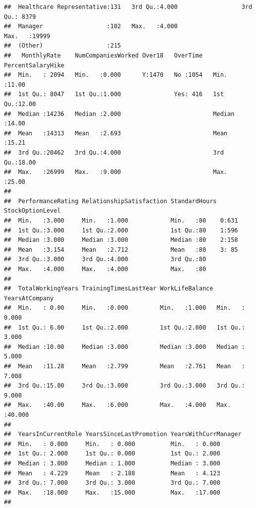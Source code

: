\documentclass[
]{article}
\begin{document}
\begin{verbatim}
##  Healthcare Representative:131   3rd Qu.:4.000                  3rd Qu.: 8379  
##  Manager                  :102   Max.   :4.000                  Max.   :19999  
##  (Other)                  :215                                                 
##   MonthlyRate    NumCompaniesWorked Over18   OverTime   PercentSalaryHike
##  Min.   : 2094   Min.   :0.000      Y:1470   No :1054   Min.   :11.00    
##  1st Qu.: 8047   1st Qu.:1.000               Yes: 416   1st Qu.:12.00    
##  Median :14236   Median :2.000                          Median :14.00    
##  Mean   :14313   Mean   :2.693                          Mean   :15.21    
##  3rd Qu.:20462   3rd Qu.:4.000                          3rd Qu.:18.00    
##  Max.   :26999   Max.   :9.000                          Max.   :25.00    
##                                                                          
##  PerformanceRating RelationshipSatisfaction StandardHours StockOptionLevel
##  Min.   :3.000     Min.   :1.000            Min.   :80    0:631           
##  1st Qu.:3.000     1st Qu.:2.000            1st Qu.:80    1:596           
##  Median :3.000     Median :3.000            Median :80    2:158           
##  Mean   :3.154     Mean   :2.712            Mean   :80    3: 85           
##  3rd Qu.:3.000     3rd Qu.:4.000            3rd Qu.:80                    
##  Max.   :4.000     Max.   :4.000            Max.   :80                    
##                                                                           
##  TotalWorkingYears TrainingTimesLastYear WorkLifeBalance YearsAtCompany  
##  Min.   : 0.00     Min.   :0.000         Min.   :1.000   Min.   : 0.000  
##  1st Qu.: 6.00     1st Qu.:2.000         1st Qu.:2.000   1st Qu.: 3.000  
##  Median :10.00     Median :3.000         Median :3.000   Median : 5.000  
##  Mean   :11.28     Mean   :2.799         Mean   :2.761   Mean   : 7.008  
##  3rd Qu.:15.00     3rd Qu.:3.000         3rd Qu.:3.000   3rd Qu.: 9.000  
##  Max.   :40.00     Max.   :6.000         Max.   :4.000   Max.   :40.000  
##                                                                          
##  YearsInCurrentRole YearsSinceLastPromotion YearsWithCurrManager
##  Min.   : 0.000     Min.   : 0.000          Min.   : 0.000      
##  1st Qu.: 2.000     1st Qu.: 0.000          1st Qu.: 2.000      
##  Median : 3.000     Median : 1.000          Median : 3.000      
##  Mean   : 4.229     Mean   : 2.188          Mean   : 4.123      
##  3rd Qu.: 7.000     3rd Qu.: 3.000          3rd Qu.: 7.000      
##  Max.   :18.000     Max.   :15.000          Max.   :17.000      
## 
\end{verbatim}
\end{document}
